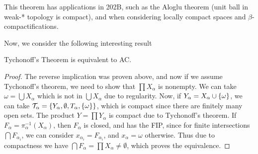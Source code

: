 This theorem has applications in 202B, such as the Aloglu theorem (unit ball in weak-* topology is compact), and when considering locally compact spaces and $\beta$-compactifications.

Now, we consider the following interesting result 

\begin{theorem}[Kelley]
    Tychonoff's Theorem is equivalent to AC.
\end{theorem}

\begin{proof}
    The reverse implication was proven above, and now if we assume Tychonoff's theorem, we need to show that $\prod X_\alpha$ is nonempty. We can take $\omega = \bigcup X_\alpha$ which is not in $\bigcup X_\alpha$ due to regularity. Now, if $Y_\alpha = X_\alpha \cup \qty{\omega}$, we can take $\mathcal T_\alpha = \qty{Y_\alpha, \emptyset, T_\alpha, \qty{\omega}}$, which is compact since there are finitely many open sets. The product $Y = \prod Y_\alpha$ is compact due to Tychonoff's theorem. If $F_\alpha = \pi_\alpha^{-1}(X_\alpha)$, then $F_\alpha$ is closed, and has the FIP, since for finite intersections $\bigcap F_{\alpha_i}$, we can consider $x_{\alpha_i} = F_{\alpha_i}$, and $x_\alpha = \omega$ otherwise. Thus due to compactness we have $\bigcap F_\alpha = \prod X_\alpha \ne \emptyset$, which proves the equivalence.
\end{proof}